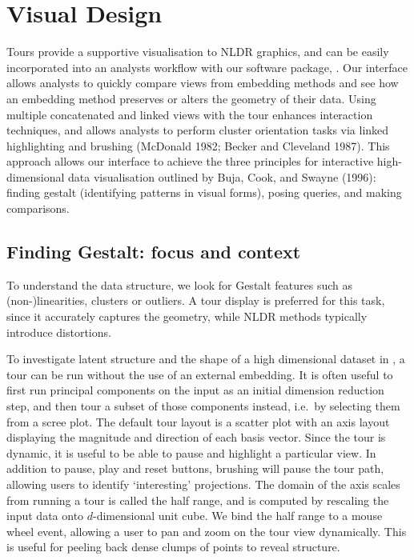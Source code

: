 \documentclass[article,notitle]{jdssv}
\begin{document}
\hypertarget{visual-design}{%
\section{Visual Design}\label{visual-design}}

Tours provide a supportive visualisation to NLDR graphics, and
can be easily incorporated into an analysts workflow with our software package,
. Our interface allows analysts to quickly compare
views from embedding methods and see how an embedding method
preserves or alters the geometry of their data. Using multiple concatenated and
linked views with the tour enhances interaction techniques, and allows
analysts to perform cluster orientation tasks via linked highlighting and
brushing (McDonald 1982; Becker and Cleveland 1987).
This approach allows our interface to achieve
the three principles for interactive high-dimensional data visualisation outlined
by Buja, Cook, and Swayne (1996): finding gestalt (identifying patterns in visual forms), posing queries, and making comparisons.

\hypertarget{finding-gestalt-focus-and-context}{%
\subsection{Finding Gestalt: focus and context}\label{finding-gestalt-focus-and-context}}

To understand the data structure, we look for Gestalt features such as
(non-)linearities, clusters or outliers. A tour display is
preferred for this task, since it accurately captures the geometry, while NLDR
methods typically introduce distortions.

To investigate latent structure and the shape of a high dimensional dataset in
, a tour can be run without the use of an external embedding.
It is often useful to
first run principal components on the input as an initial dimension reduction
step, and then tour a subset of those components instead, i.e.~by selecting
them from a scree plot. The default tour layout is a scatter plot with an axis
layout displaying the magnitude and direction of each basis vector. Since the
tour is dynamic, it is useful to be able to pause and highlight a
particular view. In addition to pause, play and reset buttons, brushing will
pause the tour path, allowing users to identify `interesting' projections.
The
domain of the axis scales from running a tour is called the half range, and is
computed by rescaling the input data onto \(d\)-dimensional unit cube. We bind
the half range to a mouse wheel event, allowing a user to pan and zoom on the
tour view dynamically. This is useful for peeling back dense clumps of points
to reveal structure.
\end{document}
